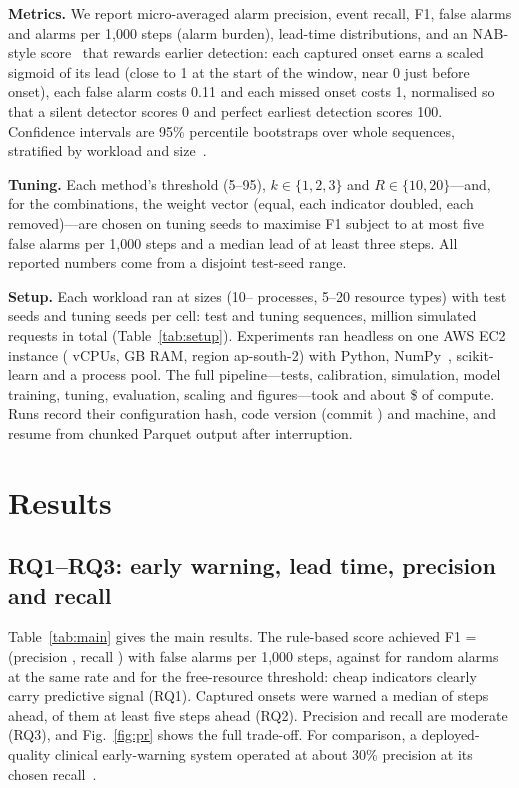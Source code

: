 \documentclass[conference]{IEEEtran}
\begin{document}
\textbf{Metrics.} We report micro-averaged alarm precision, event recall, F1, false alarms and alarms per 1,000 steps (alarm burden), lead-time distributions, and an NAB-style score~\cite{Lavin2015} that rewards earlier detection: each captured onset earns a scaled sigmoid of its lead (close to 1 at the start of the window, near 0 just before onset), each false alarm costs 0.11 and each missed onset costs 1, normalised so that a silent detector scores 0 and perfect earliest detection scores 100. Confidence intervals are 95\% percentile bootstraps over whole sequences, stratified by workload and size~\cite{Efron1993}.

\textbf{Tuning.} Each method's threshold (5--95), $k\in\{1,2,3\}$ and $R\in\{10,20\}$---and, for the combinations, the weight vector (equal, each indicator doubled, each removed)---are chosen on tuning seeds to maximise F1 subject to at most five false alarms per 1,000 steps and a median lead of at least three steps. All reported numbers come from a disjoint test-seed range.

\textbf{Setup.} Each workload ran at \NSizes{} sizes (10--\MaxN{} processes, 5--20 resource types) with \NSeedsPerCell{} test seeds and \NSeedsTune{} tuning seeds per cell: \NSeqTest{} test and \NSeqTune{} tuning sequences, \NStepsAllM{} million simulated requests in total (Table~\ref{tab:setup}). Experiments ran headless on one AWS EC2 \Machine{} instance (\CPUs{} vCPUs, \RamGB{} GB RAM, region ap-south-2) with Python, NumPy~\cite{Harris2020}, scikit-learn and a process pool. The full pipeline---tests, calibration, simulation, model training, tuning, evaluation, scaling and figures---took \AwsWall{} and about \$\AwsCost{} of compute. Runs record their configuration hash, code version (commit \texttt{\GitCommit}) and machine, and resume from chunked Parquet output after interruption.



\section{Results}


\subsection{RQ1--RQ3: early warning, lead time, precision and recall}
Table~\ref{tab:main} gives the main results. The rule-based score achieved F1 = \CombF{} (precision \CombP, recall \CombR) with \CombFA{} false alarms per 1,000 steps, against \RandF{} for random alarms at the same rate and \AvailF{} for the free-resource threshold: cheap indicators clearly carry predictive signal (RQ1). Captured onsets were warned a median of \CombLead{} steps ahead, \CombLeadFive{} of them at least five steps ahead (RQ2). Precision and recall are moderate (RQ3), and Fig.~\ref{fig:pr} shows the full trade-off. For comparison, a deployed-quality clinical early-warning system operated at about 30\% precision at its chosen recall~\cite{Hyland2020}.
\end{document}
